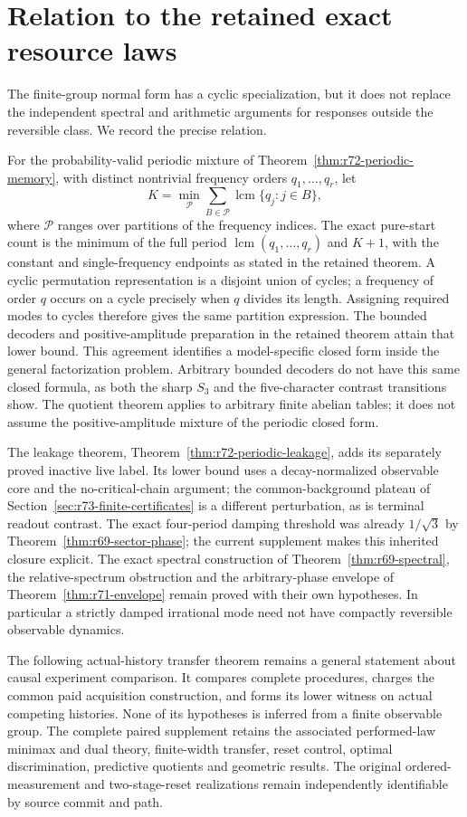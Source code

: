 \section{Relation to the retained exact resource laws}
\label{sec:r73-consequences}
The finite-group normal form has a cyclic specialization, but it does not
replace the independent spectral and arithmetic arguments for responses
outside the reversible class. We record the precise relation.

For the probability-valid periodic mixture of
Theorem~\ref{thm:r72-periodic-memory}, with distinct nontrivial frequency
orders $q_1,\ldots,q_r$, let
\[
 K=\min_{\mathcal P}\sum_{B\in\mathcal P}
                  \operatorname{lcm}\{q_j:j\in B\},
\]
where $\mathcal P$ ranges over partitions of the frequency indices.
The exact pure-start count is the minimum of the full period
$\operatorname{lcm}(q_1,\ldots,q_r)$ and $K+1$, with the constant and
single-frequency endpoints as stated in the retained theorem.
A cyclic permutation representation is a disjoint union of cycles; a
frequency of order $q$ occurs on a cycle precisely when $q$ divides its
length. Assigning required modes to cycles therefore gives the same
partition expression. The bounded decoders and positive-amplitude
preparation in the retained theorem attain that lower bound. This agreement
identifies a model-specific closed form inside the general factorization
problem. Arbitrary bounded decoders do not have this same closed formula,
as both the sharp $S_3$ and the five-character contrast transitions show.
The quotient theorem applies to arbitrary finite abelian tables; it does
not assume the positive-amplitude mixture of the periodic closed form.

The leakage theorem, Theorem~\ref{thm:r72-periodic-leakage}, adds its
separately proved inactive live label. Its lower bound uses a
decay-normalized observable core and the no-critical-chain argument;
the common-background plateau of Section~\ref{sec:r73-finite-certificates}
is a different perturbation, as is terminal readout contrast.
The exact four-period damping threshold was already $1/\sqrt3$ by
Theorem~\ref{thm:r69-sector-phase}; the current supplement makes this
inherited closure explicit. The exact spectral construction of
Theorem~\ref{thm:r69-spectral}, the relative-spectrum obstruction and
the arbitrary-phase envelope of Theorem~\ref{thm:r71-envelope} remain
proved with their own hypotheses. In particular a strictly damped
irrational mode need not have compactly reversible observable dynamics.

The following actual-history transfer theorem remains a general statement
about causal experiment comparison. It compares complete procedures,
charges the common paid acquisition construction, and forms its lower
witness on actual competing histories. None of its hypotheses is inferred
from a finite observable group. The complete paired supplement retains the
associated performed-law minimax and dual theory, finite-width transfer,
reset control, optimal discrimination, predictive quotients and geometric
results. The original ordered-measurement and two-stage-reset realizations
remain independently identifiable by source commit and path.
